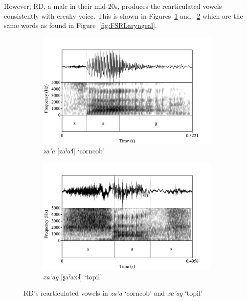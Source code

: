 However, RD, a male in their mid-20s, produces the rearticulated vowels consistently with creaky voice. This is shown in Figures~\ref{fig:RDza'a} and ~\ref{fig:RDxa'ag} which are the same words as found in Figure~\ref{fig:FSRLaryngeal}. 

\begin{figure}[h!]
	\centering
	\begin{subfigure}{.5\textwidth}
		\centering
		\includegraphics[width=\linewidth]{images/Spectrograms/RD_za'a.png}
		\caption{\textit{za'a} [zaˀa˧˥] `corncob'}
		\label{fig:RDza'a}
	\end{subfigure}%
	\begin{subfigure}{.5\textwidth}
		\centering
		\includegraphics[width=\linewidth]{images/Spectrograms/RD_xa'ag.png}
		\caption{\textit{xa'ag} [ʂaˀax˨] `topil'}
		\label{fig:RDxa'ag}
	\end{subfigure}
	\caption{RD's rearticulated vowels in \textit{za'a} `corncob' and \textit{xa'ag} `topil'}
	\label{fig:RDLaryngeal}
\end{figure}

